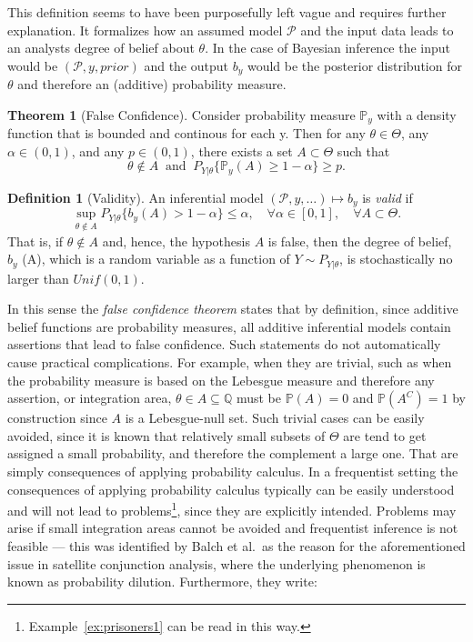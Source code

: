 \documentclass[
]{report}
\theoremstyle{definition}
\newtheorem{theorem}{Theorem}
\theoremstyle{definition}
\newtheorem{definition}{Definition}[section]
\begin{document}
This definition seems to have been purposefully left vague and requires
further explanation. It formalizes how an assumed model \(\mathscr{P}\)
and the input data leads to an analysts degree of belief about
\(\theta\). In the case of Bayesian inference the input would be
\((\mathscr{P}, y, prior)\) and the output \(b_y\) would be the
posterior distribution for \(\theta\) and therefore an (additive)
probability measure.

\begin{theorem}[False Confidence] Consider probability measure $\mathbb{P}_y$ with a density function that is bounded and continous for each y. Then for any $\theta \in \Theta$, any $\alpha \in (0,1)$, and any $p \in (0,1)$, there exists a set $A \subset \Theta$ such that
$$\theta \notin A  \ \text{ and } \ P_{Y| \theta} \{\mathbb{P}_y (A) \geq 1 - \alpha \} \geq p.$$
\end{theorem}

\begin{definition}[Validity]\label{def:validity}
An inferential model $( \mathscr{P},y, \dots) \mapsto b_y$ is \textit{valid} if
$$\sup_{\theta \notin A} P_{Y|\theta} \{b_y (A) > 1- \alpha \} \leq \alpha , \quad \forall \alpha \in [0, 1], \quad \forall A \subset \Theta .$$
That is, if $\theta \notin A$ and, hence, the hypothesis $A$ is false, then the degree of belief, $b_y$ (A), which is a random variable as a function of $Y \sim P_{Y|\theta}$, is stochastically no larger than $Unif(0,1)$.
\end{definition}

In this sense the \textit{false confidence theorem} states that by
definition, since additive belief functions are probability measures,
all additive inferential models contain assertions that lead to false
confidence. Such statements do not automatically cause practical
complications. For example, when they are trivial, such as when the
probability measure is based on the Lebesgue measure and therefore any
assertion, or integration area, \(\theta \in A \subseteq \mathbb{Q}\)
must be \(\mathbb{P}(A) = 0\) and \(\mathbb{P}(A^C) = 1\) by
construction since \(A\) is a Lebesgue-null set. Such trivial cases can
be easily avoided, since it is known that relatively small subsets of
\(\Theta\) are tend to get assigned a small probability, and therefore
the complement a large one. That are simply consequences of applying
probability calculus. In a frequentist setting the consequences of
applying probability calculus typically can be easily understood and
will not lead to
problems\footnote{Example~\ref{ex:prisoners1} can be read in this way.},
since they are explicitly intended. Problems may arise if small
integration areas cannot be avoided and frequentist inference is not
feasible --- this was identified by Balch et al.~as the reason for the
aforementioned issue in satellite conjunction analysis, where the
underlying phenomenon is known as probability dilution. Furthermore,
they write:
\end{document}
